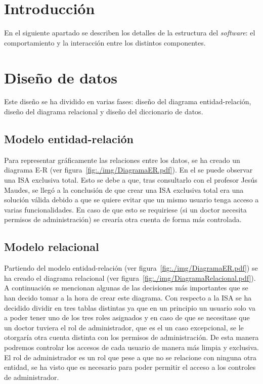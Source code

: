
\section{Introducción}
En el siguiente apartado se describen los detalles de la estructura del \textit{software}: el comportamiento y la interacción entre los distintos componentes.

\section{Diseño de datos}
Este diseño se ha dividido en varias fases: diseño del diagrama entidad-relación, diseño del diagrama relacional y diseño del diccionario de datos.

\subsection{Modelo entidad-relación}

Para representar gráficamente las relaciones entre los datos, se ha creado un diagrama E-R (ver figura~\ref{fig:./img/DiagramaER.pdf}). En el se puede observar una ISA exclusiva total. Esto se debe a que, tras consultarlo con el profesor Jesús Maudes, se llegó a la conclusión de que crear una ISA exclusiva total era una solución válida debido a que se quiere evitar que un mismo usuario tenga acceso a varias funcionalidades. En caso de que esto se requiriese (si un doctor necesita permisos de administración) se crearía otra cuenta de forma más controlada.
\begin{landscape}
\end{landscape}
\subsection{Modelo relacional}

Partiendo del modelo entidad-relación (ver figura~\ref{fig:./img/DiagramaER.pdf}) se ha creado el diagrama relacional (ver figura~\ref{fig:./img/DiagramaRelacional.pdf}).
A continuación se mencionan algunas de las decisiones más importantes que se han decido tomar a la hora de crear este diagrama.
Con respecto a la ISA se ha decidido dividir en tres tablas distintas ya que en un principio un usuario solo va a poder tener uno de los tres roles asignados y en caso de que se necesitase que un doctor tuviera el rol de administrador, que es el un caso excepcional, se le otorgaría otra cuenta distinta con los permisos de administración. De esta manera podremos controlar los accesos de cada usuario de manera más limpia y exclusiva.
El rol de administrador es un rol que pese a que no se relacione con ninguna otra entidad, se ha visto que es necesario para poder permitir el acceso a los controles de administrador.

